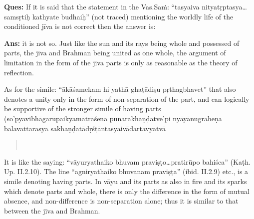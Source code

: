 \textbf{Ques:} If it is said that the statement in the Vas.Saṁ: “tasyaiva nityatṛptasya…samsṛtiḥ kathyate budhaiḥ” (not traced) mentioning the worldly life of the conditioned jīva is not correct then the answer is: 

\textbf{Ans:} it is not so. Just like the sun and its rays being whole and possessed of parts, the jīva and Brahman being united as one whole, the argument of limitation in the form of the jīva parts is only as reasonable as the theory of reflection.

As for the simile: “ākāśamekam hi yathā ghaṭādiṣu pṛthagbhavet” that also denotes a unity only in the form of non-separation of the part, and can logically be supportive of the stronger simile of having parts (so’pyavibhāgarūpaikyamātrāśena punarakhaṇḍatve’pi nyāyānugra\-heṇa balavattarasya sakhaṇḍatādṛśṭāntasyaivādartavyatvā

\begin{verse}
\\
\end{verse}


It is like the saying: “vāyuryathaiko bhuvam praviṣṭo…pratirūpo bahiśca” (Kaṭh. Up. II.2.10). The line “agniryathaiko bhuvanam praviṣṭa” (ibid. II.2.9) etc., is a simile denoting having parts.  In vāyu and its parts as also in fire and its sparks which denote parts and whole, there is only the difference in the form of mutual absence, and non-difference is non-separation alone; thus it is similar to that between the jīva and Brahman.

